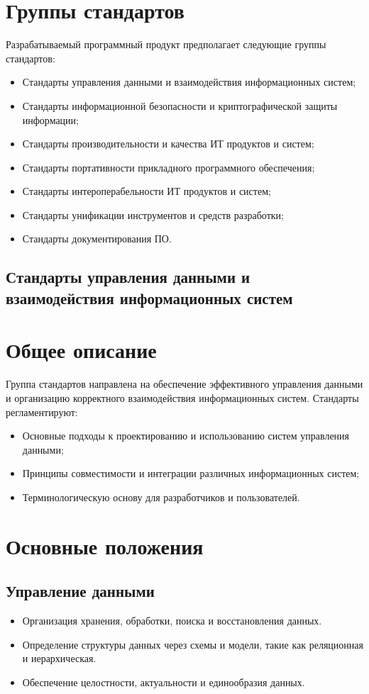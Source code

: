 
\section{Группы стандартов}

Разрабатываемый программный продукт предполагает следующие группы стандартов:

\begin{itemize}
    \item Стандарты управления данными и взаимодействия информационных систем;
    \item Стандарты информационной безопасности и криптографической защиты информации;
    \item Стандарты производительности и качества ИТ продуктов и систем;
    \item Стандарты портативности прикладного программного обеспечения;
    \item Стандарты интероперабельности ИТ продуктов и систем;
    \item Стандарты унификации инструментов и средств разработки;
    \item Стандарты документирования ПО.
\end{itemize}

\subsection{Стандарты управления данными и взаимодействия информационных систем}

\section*{Общее описание}
Группа стандартов направлена на обеспечение эффективного управления данными и организацию корректного взаимодействия информационных систем. Стандарты регламентируют:
\begin{itemize}
    \item Основные подходы к проектированию и использованию систем управления данными;
    \item Принципы совместимости и интеграции различных информационных систем;
    \item Терминологическую основу для разработчиков и пользователей.
\end{itemize}

\section*{Основные положения}
\subsection*{Управление данными}
\begin{itemize}
    \item Организация хранения, обработки, поиска и восстановления данных.
    \item Определение структуры данных через схемы и модели, такие как реляционная и иерархическая.
    \item Обеспечение целостности, актуальности и единообразия данных.
\end{itemize}

